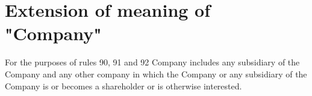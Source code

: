\section{Extension of meaning of "Company"}

For the purposes of rules 90, 91 and 92 Company includes any subsidiary of the Company and any other company in which the Company or any subsidiary of the Company is or becomes a shareholder or is otherwise interested. 